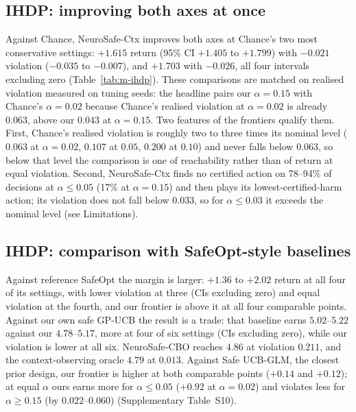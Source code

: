 \documentclass[10pt,a4paper]{article}
\begin{document}
\subsection*{IHDP: improving both axes at once}
Against Chance, NeuroSafe-Ctx improves both axes at Chance's two most conservative settings: $+1.615$
return (95\% CI $+1.405$ to $+1.799$) with $-0.021$ violation ($-0.035$ to $-0.007$), and $+1.703$ with
$-0.026$, all four intervals excluding zero (Table~\ref{tab:m-ihdp}). These comparisons are matched on realised violation measured on tuning seeds: the headline pairs our $\alpha=0.15$ with Chance's $\alpha=0.02$ because Chance's realised violation at $\alpha=0.02$ is already $0.063$, above our $0.043$ at $\alpha=0.15$. Two features of the frontiers qualify them. First, Chance's
realised violation is roughly two to three times its nominal level ($0.063$ at $\alpha=0.02$, $0.107$
at $0.05$, $0.200$ at $0.10$) and never falls below $0.063$, so below that level the comparison is one
of reachability rather than of return at equal violation. Second, NeuroSafe-Ctx finds no certified
action on 78--94\% of decisions at $\alpha\le0.05$ (17\% at $\alpha=0.15$) and then plays its
lowest-certified-harm action; its violation does not fall below $0.033$, so for $\alpha\le0.03$ it exceeds the nominal level (see Limitations). 

\subsection*{IHDP: comparison with SafeOpt-style baselines}
Against reference SafeOpt the margin is larger: $+1.36$ to $+2.02$ return at all four of its settings,
with lower violation at three (CIs excluding zero) and equal violation at the fourth, and our frontier
is above it at all four comparable points. Against our own safe GP-UCB the result is a trade: that
baseline earns $5.02$--$5.22$ against our $4.78$--$5.17$, more at four of six settings (CIs excluding
zero), while our violation is lower at all six. NeuroSafe-CBO reaches $4.86$ at violation $0.211$, and the context-observing oracle $4.79$ at $0.013$. Against Safe UCB-GLM, the closest prior design, our frontier is higher at both comparable points ($+0.14$ and $+0.12$); at equal $\alpha$ ours earns more for $\alpha\le0.05$ ($+0.92$ at $\alpha=0.02$) and violates less for $\alpha\ge0.15$ (by $0.022$--$0.060$) (Supplementary Table~S10).

\begin{table}[t]
\caption{\textbf{Paired tests at operating points matched on tuning seeds, IHDP with a binding harm
channel.} Differences are ours minus the baseline over 50 held-out seeds, with 95\% bootstrap CIs; bold
marks CIs that exclude zero.}
\label{tab:m-ihdp}
\centering\small
\resizebox{\linewidth}{!}{}
\end{table}
\end{document}
